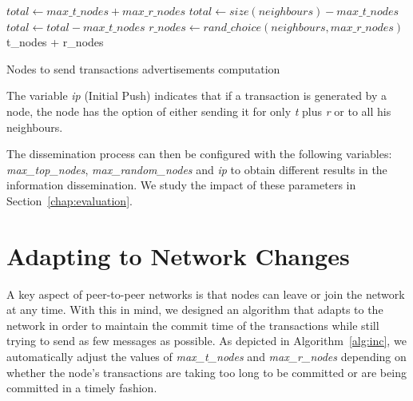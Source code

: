 \begin{algorithm}[t]
\begin{algorithmic}[1]
\EndIf
\State $total \gets max\_t\_nodes + max\_r\_nodes$
	\State $total \gets size(neighbours) - max\_t\_nodes$
\Else
	\State $total \gets total - max\_t\_nodes$
    \EndIf
{}
	\State $r\_nodes \gets rand\_choice(neighbours, max\_r\_nodes)$
    \EndIf
\State \Return t\_nodes + r\_nodes
\EndFunction
\end{algorithmic}
\caption{Nodes to send transactions advertisements computation}
\label{alg:diss}
\end{algorithm}

The variable \textsl{ip} (Initial Push) indicates that if a transaction is generated by a node, the node has the option of either sending it for only \textit{t} plus \textit{r} or to all his neighbours.

The dissemination process can then be configured with the following variables: \textsl{max\_top\_nodes}, \textsl{max\_random\_nodes} and \textsl{ip} to obtain different results in the information dissemination.
We study the impact of these parameters in Section~\ref{chap:evaluation}.

\section{Adapting to Network Changes}
\label{sec:nc}
A key aspect of peer-to-peer networks is that nodes can leave or join the network at any  time. With this in mind, we designed an algorithm that adapts to the network in order to maintain the commit time of the transactions while still trying to send as few messages as possible. As  depicted in Algorithm~\ref{alg:inc}, we automatically adjust the values of \textsl{max\_t\_nodes} and \textsl{max\_r\_nodes} depending on whether the node's transactions are taking too long to be committed or are being committed in a  timely fashion.

